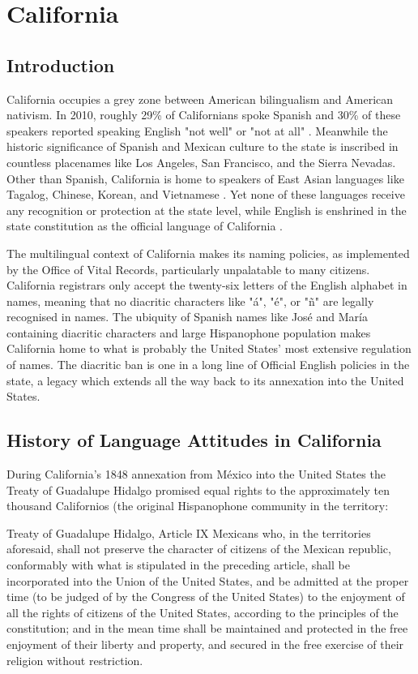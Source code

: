 \section{California}

\subsection{Introduction}

California occupies a grey zone between American bilingualism and American nativism. In 2010, roughly 29\% of Californians spoke Spanish and 30\% of these speakers reported speaking English "not well" or "not at all" \parencite{acs-lang-states}. Meanwhile the historic significance of Spanish and Mexican culture to the state is inscribed in countless placenames like Los Angeles, San Francisco, and the Sierra Nevadas. Other than Spanish, California is home to speakers of East Asian languages like Tagalog, Chinese, Korean, and Vietnamese \parencite{acs-lang-states}. Yet none of these languages receive any recognition or protection at the state level, while English is enshrined in the state constitution as the official language of California \parencite{ca-const}.

The multilingual context of California makes its naming policies, as implemented by the Office of Vital Records, particularly unpalatable to many citizens. California registrars only accept the twenty-six letters of the English alphabet in names, meaning that no diacritic characters like "á", "é", or "ñ" are legally recognised in names. The ubiquity of Spanish names like José and María containing diacritic characters and large Hispanophone population makes California home to what is probably the United States' most extensive regulation of names. The diacritic ban is one in a long line of Official English policies in the state, a legacy which extends all the way back to its annexation into the United States.

\subsection{History of Language Attitudes in California}

During California's 1848 annexation from México into the United States the Treaty of Guadalupe Hidalgo promised equal rights to the approximately ten thousand Californios (the original Hispanophone community in the territory:

\begin{aquote}{Treaty of Guadalupe Hidalgo, Article IX}
	Mexicans who, in the territories aforesaid, shall not preserve the character
	of citizens of the Mexican republic, conformably with what is stipulated in
	the preceding article, shall be incorporated into the Union of the United
	States, and be admitted at the proper time (to be judged of by the Congress of
	the United States) to the enjoyment of all the rights of citizens of the
	United States, according to the principles of the constitution; and in the
	mean time shall be maintained and protected in the free enjoyment of their
	liberty and property, and secured in the free exercise of their religion
	without restriction. \parencite{guadalupe}
\end{aquote}

